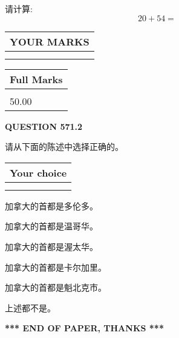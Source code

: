 \documentclass{ctexart}
\begin{document}
  
 
请计算:
\begin{equation}
20 +  %
54 = \nonumber
\end{equation}
 

 

 
  
\vspace{0.2in}
  
\noindent\begin{tabular}{|l|}
\hline
 YOUR MARKS  \\
\hline
 \\ 
 \\ 
\hline
\end{tabular}
\hspace{0.05in} \begin{tabular}{|l|}
\hline
 Full Marks  \\
\hline
 \\ 
50.00 \\
\hline
\end{tabular}
{\textbf{\Large{QUESTION
571.2 
}}}
  
  
请从下面的陈述中选择正确的。
  
  
\noindent\hspace{3.0in} \begin{tabular}{|l|}
\hline
Your choice \\
\hline
 \\ 
 \\ 
\hline
\end{tabular}
  
  
 
 
加拿大的首都是多伦多。
 
 
加拿大的首都是温哥华。
 
 
加拿大的首都是渥太华。
 
 
加拿大的首都是卡尔加里。
 
 
加拿大的首都是魁北克市。
 
 
 上述都不是。
 
 
   
   
 \vspace{0.2in}
 
   
   
   
   
\vspace{1.0in} 
{\textbf{\large{ *** END OF PAPER, THANKS *** }}} 
   
\end{document}
